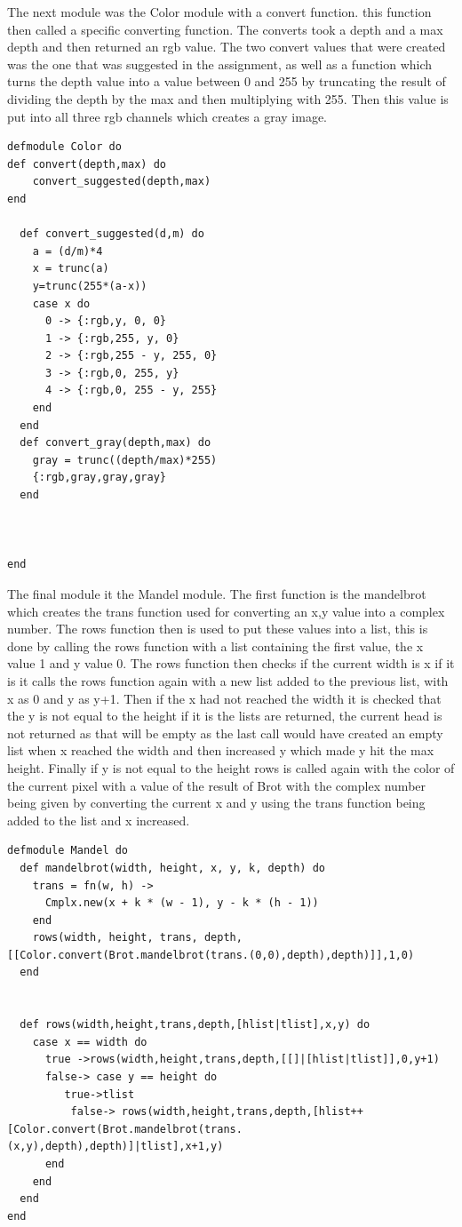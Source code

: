 \documentclass[a4paper,11pt]{article}
\begin{document}
 The next module was the Color module with a convert function. this function then called a specific converting function. The converts took a depth and a max depth and then returned an rgb value. The two convert values that were created was the one that was suggested in the assignment, as well as a function which turns the depth value into a value between 0 and 255 by truncating the result of dividing the depth by the max and then multiplying with 255. Then this value is put into all three rgb channels which creates a gray image.
 \begin{verbatim}
defmodule Color do
def convert(depth,max) do
    convert_suggested(depth,max)
end

  def convert_suggested(d,m) do
    a = (d/m)*4
    x = trunc(a)
    y=trunc(255*(a-x))
    case x do
      0 -> {:rgb,y, 0, 0}
      1 -> {:rgb,255, y, 0}
      2 -> {:rgb,255 - y, 255, 0}
      3 -> {:rgb,0, 255, y}
      4 -> {:rgb,0, 255 - y, 255}
    end
  end
  def convert_gray(depth,max) do
    gray = trunc((depth/max)*255)
    {:rgb,gray,gray,gray}
  end



end
\end{verbatim}
The final module it the Mandel module. The first function is the mandelbrot which creates the trans function used for converting an x,y value into a complex number. The rows function then is used to put these values into a list, this is done by calling the rows function with a list containing the first value, the x value 1 and y value 0. The rows function then checks if the current width is x if it is it calls the rows function again with a new list added to the previous list, with x as 0 and y as y+1. 
Then if the x had not reached the width it is checked that the y is not equal to the height if it is the lists are returned, the current head is not returned as that will be empty as the last call would have created an empty list when x reached the width and then increased y which made y hit the max height. Finally if y is not equal to the height rows is called again with the color of the current pixel with a value of the result of Brot with the complex number being given by converting the current x and y using the trans function being added to the list and x increased.
\begin{verbatim}
defmodule Mandel do
  def mandelbrot(width, height, x, y, k, depth) do
    trans = fn(w, h) ->
      Cmplx.new(x + k * (w - 1), y - k * (h - 1))
    end
    rows(width, height, trans, depth, [[Color.convert(Brot.mandelbrot(trans.(0,0),depth),depth)]],1,0)
  end


  def rows(width,height,trans,depth,[hlist|tlist],x,y) do
    case x == width do
      true ->rows(width,height,trans,depth,[[]|[hlist|tlist]],0,y+1)
      false-> case y == height do
         true->tlist
          false-> rows(width,height,trans,depth,[hlist++[Color.convert(Brot.mandelbrot(trans.(x,y),depth),depth)]|tlist],x+1,y)
      end
    end
  end
end
\end{verbatim} 
\end{document}
